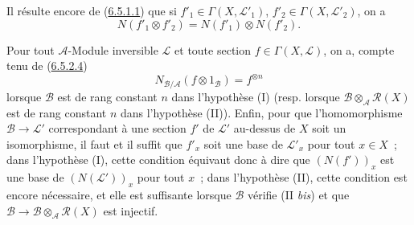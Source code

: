 \begin{env}[6.5.3]
Il résulte encore de (\hyperref[II.6.5.1.1-fr]{6.5.1.1}) que si
$f'_1\in\Gamma(X,\mathcal{L}'_1)$, $f'_2\in\Gamma(X,\mathcal{L}'_2)$, on a
\[
\label{II.6.5.3.1-fr}
N(f'_1\otimes f'_2)=N(f'_1)\otimes N(f'_2).
\tag{6.5.3.1}
\]

Pour tout $\mathcal{A}$-Module inversible $\mathcal{L}$ et toute section
$f\in\Gamma(X,\mathcal{L})$, on a, compte tenu de
(\hyperref[II.6.5.2.4-fr]{6.5.2.4})
\[
\label{II.6.5.3.2-fr}
N_{\mathcal{B}/\mathcal{A}}(f\otimes1_{\mathcal{B}})=f^{\otimes n}
\tag{6.5.3.2}
\]
lorsque $\mathcal{B}$ est de rang constant $n$ dans l'hypothèse (I) (resp.
lorsque $\mathcal{B}\otimes_{\mathcal{A}}\mathcal{R}(X)$ est de rang constant
$n$ dans l'hypothèse (II)). Enfin, pour que l'homomorphisme
$\mathcal{B}\to\mathcal{L}'$ correspondant à une section $f'$ de
$\mathcal{L}'$ au-dessus de $X$ soit un isomorphisme, il faut et il suffit que
$f'_x$ soit une base de $\mathcal{L}'_x$ pour tout $x\in X$~; dans l'hypothèse
(I), cette condition équivaut donc à dire que $(N(f'))_x$ est une base de
$(N(\mathcal{L}'))_x$ pour tout $x$~; dans l'hypothèse (II), cette condition
est encore nécessaire, et elle est suffisante lorsque $\mathcal{B}$ vérifie
(II \emph{bis}) et que
$\mathcal{B}\to\mathcal{B}\otimes_{\mathcal{A}}\mathcal{R}(X)$ est injectif.
\end{env}

